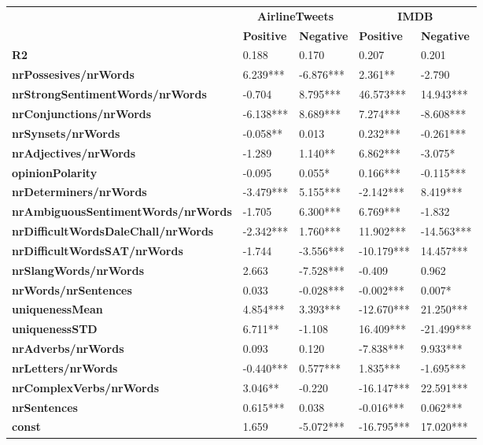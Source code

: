 \begin{tabular}{|l|l|l|l|l|} \cline{2-5}
\multicolumn{1}{c|}{} & \multicolumn{2}{c|}{\textbf{AirlineTweets}} & \multicolumn{2}{c|}{\textbf{IMDB}}\\ \cline{2-5}
\multicolumn{1}{c|}{} & \textbf{Positive} & \textbf{Negative} & \textbf{Positive} & \textbf{Negative} \\ \hline
\textbf{R2} & 0.188 & 0.170 & 0.207 & 0.201 \\ \Xhline{3\arrayrulewidth}
\textbf{{\scriptsize nrPossesives/nrWords}} & 6.239*** & -6.876*** & 2.361** & -2.790 \\ \hline
\textbf{{\scriptsize nrStrongSentimentWords/nrWords}} & -0.704 & 8.795*** & 46.573*** & 14.943*** \\ \hline
\textbf{{\scriptsize nrConjunctions/nrWords}} & -6.138*** & 8.689*** & 7.274*** & -8.608*** \\ \hline
\textbf{{\scriptsize nrSynsets/nrWords}} & -0.058** & 0.013 & 0.232*** & -0.261*** \\ \hline
\textbf{{\scriptsize nrAdjectives/nrWords}} & -1.289 & 1.140** & 6.862*** & -3.075* \\ \hline
\textbf{{\scriptsize opinionPolarity}} & -0.095 & 0.055* & 0.166*** & -0.115*** \\ \hline
\textbf{{\scriptsize nrDeterminers/nrWords}} & -3.479*** & 5.155*** & -2.142*** & 8.419*** \\ \hline
\textbf{{\scriptsize nrAmbiguousSentimentWords/nrWords}} & -1.705 & 6.300*** & 6.769*** & -1.832 \\ \hline
\textbf{{\scriptsize nrDifficultWordsDaleChall/nrWords}} & -2.342*** & 1.760*** & 11.902*** & -14.563*** \\ \hline
\textbf{{\scriptsize nrDifficultWordsSAT/nrWords}} & -1.744 & -3.556*** & -10.179*** & 14.457*** \\ \hline
\textbf{{\scriptsize nrSlangWords/nrWords}} & 2.663 & -7.528*** & -0.409 & 0.962 \\ \hline
\textbf{{\scriptsize nrWords/nrSentences}} & 0.033 & -0.028*** & -0.002*** & 0.007* \\ \hline
\textbf{{\scriptsize uniquenessMean}} & 4.854*** & 3.393*** & -12.670*** & 21.250*** \\ \hline
\textbf{{\scriptsize uniquenessSTD}} & 6.711** & -1.108 & 16.409*** & -21.499*** \\ \hline
\textbf{{\scriptsize nrAdverbs/nrWords}} & 0.093 & 0.120 & -7.838*** & 9.933*** \\ \hline
\textbf{{\scriptsize nrLetters/nrWords}} & -0.440*** & 0.577*** & 1.835*** & -1.695*** \\ \hline
\textbf{{\scriptsize nrComplexVerbs/nrWords}} & 3.046** & -0.220 & -16.147*** & 22.591*** \\ \hline
\textbf{{\scriptsize nrSentences}} & 0.615*** & 0.038 & -0.016*** & 0.062*** \\ \hline
\textbf{{\scriptsize const}} & 1.659 & -5.072*** & -16.795*** & 17.020*** \\ \hline
\end{tabular}